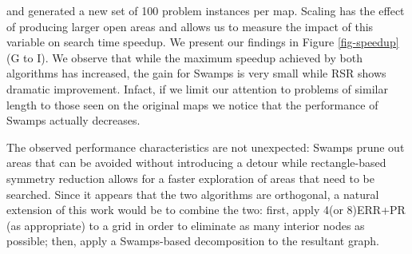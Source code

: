 and generated a new set of 100 problem instances per map. 
Scaling has the effect of producing larger open areas and allows 
us to measure the impact of this variable on search time speedup.
We present our findings in  Figure \ref{fig-speedup} (G to I).
We observe that while the maximum speedup achieved by both algorithms has
increased, the gain for Swamps is very small while RSR shows dramatic
improvement.
Infact, if we limit our attention to problems of similar length to those seen 
on the original maps we notice that the performance of Swamps actually
decreases.
\par
The observed performance characteristics are not unexpected: Swamps prune out
areas that can be avoided without introducing a detour while rectangle-based
symmetry reduction allows for a faster exploration of areas that need to be
searched.  Since it appears that the two algorithms are orthogonal, a natural
extension of this work would be to combine the two: first, apply 4(or 8)ERR+PR
(as appropriate) to a grid in order to eliminate as many interior nodes as
possible; then, apply a Swamps-based decomposition to the resultant graph.
